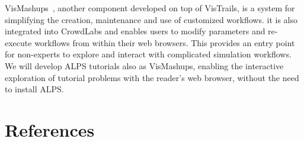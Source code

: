\documentclass[12pt]{iopart}
\begin{document}
VisMashups~\cite{Santos09}, another component developed on top of VisTrails, is a system for simplifying the creation,
maintenance and use of customized workflows. it is also
integrated into CrowdLabs and enables users to modify parameters and
re-execute workflows from within their web browsers. This provides an
entry point for non-experts to explore and interact with complicated
simulation workflows. We will develop ALPS tutorials also as VisMashups, enabling the interactive exploration of tutorial problems with the reader's web browser, without the need to install ALPS.




\section*{References}



\end{document}
